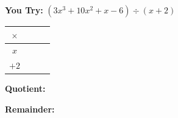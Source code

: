 \documentclass[11pt]{article}
\begin{document}
\textbf{You Try:} $(3x^3 + 10x^2 + x - 6) \div (x + 2)$

\vspace{0.1cm}
\begin{minipage}[t]{0.55\textwidth}
\centering
\renewcommand{\arraystretch}{2.2}
\begin{tabular}{|c||p{0.7in}|p{0.7in}|p{0.7in}|}
\hline
$\times$ & & & \\
\hline\hline
$x$ & & & \\
\hline
$+2$ & & & \\
\hline
\end{tabular}
\end{minipage}
\hfill
\begin{minipage}[t]{0.4\textwidth}
\vspace{0.3in}
\textbf{Quotient:} \underline{\hspace{1.5in}}

\vspace{0.2in}
\textbf{Remainder:} \underline{\hspace{1.2in}}
\end{minipage}
\end{document}

